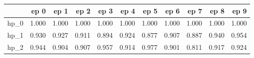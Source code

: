 \begin{tabular}{lrrrrrrrrrr}
\toprule
{} &   ep 0 &   ep 1 &   ep 2 &   ep 3 &   ep 4 &   ep 5 &   ep 6 &   ep 7 &   ep 8 &   ep 9 \\
\midrule
hp\_0 &  1.000 &  1.000 &  1.000 &  1.000 &  1.000 &  1.000 &  1.000 &  1.000 &  1.000 &  1.000 \\
hp\_1 &  0.930 &  0.927 &  0.911 &  0.894 &  0.924 &  0.877 &  0.907 &  0.887 &  0.940 &  0.954 \\
hp\_2 &  0.944 &  0.904 &  0.907 &  0.957 &  0.914 &  0.977 &  0.901 &  0.811 &  0.917 &  0.924 \\
\bottomrule
\end{tabular}
